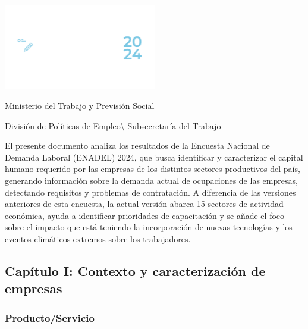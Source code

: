 \documentclass[
  11pt,
]{article}
\author{}
\date{}
\renewcommand*\contentsname{Tabla de contenidos}
\newcommand\contentsname{Tabla de contenidos}
\begin{document}




\pagecolor{customblue} 
\thispagestyle{empty} 
\color{white}

\centering

\includegraphics[width=0.5\textwidth]{../Logotipo ENADEL/Logotipo ENADEL-02.png}
\vspace{2cm}

\noindent Ministerio del Trabajo y Previsión Social

División de Políticas de Empleo\textbackslash{} Subsecretaría del
Trabajo

\justifying

El presente documento analiza los resultados de la Encuesta Nacional de
Demanda Laboral (ENADEL) 2024, que busca identificar y caracterizar el
capital humano requerido por las empresas de los distintos sectores
productivos del país, generando información sobre la demanda actual de
ocupaciones de las empresas, detectando requisitos y problemas de
contratación. A diferencia de las versiones anteriores de esta encuesta,
la actual versión abarca 15 sectores de actividad económica, ayuda a
identificar prioridades de capacitación y se añade el foco sobre el
impacto que está teniendo la incorporación de nuevas tecnologías y los
eventos climáticos extremos sobre los trabajadores.

\newpage
\nopagecolor
\color{black}
\renewcommand{\contentsname}{Índice} 
\tableofcontents

\newpage

\subsection{Capítulo I: Contexto y caracterización de
empresas}\label{capuxedtulo-i-contexto-y-caracterizaciuxf3n-de-empresas}

\subsubsection{Producto/Servicio}\label{productoservicio}
\end{document}

